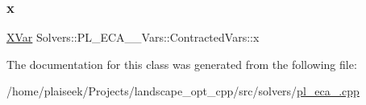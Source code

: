 \subsubsection{\texorpdfstring{x}{x}}
{\footnotesize\ttfamily \hyperlink{class_solvers_1_1_p_l___e_c_a__3___vars_1_1_x_var}{X\+Var} Solvers\+::\+P\+L\+\_\+\+E\+C\+A\+\_\+\_\+\+Vars\+::\+Contracted\+Vars\+::x}



The documentation for this class was generated from the following file\+:\begin{DoxyCompactItemize}
\item 
/home/plaiseek/\+Projects/landscape\+\_\+opt\+\_\+cpp/src/solvers/\hyperlink{pl__eca__3_8cpp}{pl\+\_\+eca\+\_.\+cpp}\end{DoxyCompactItemize}
